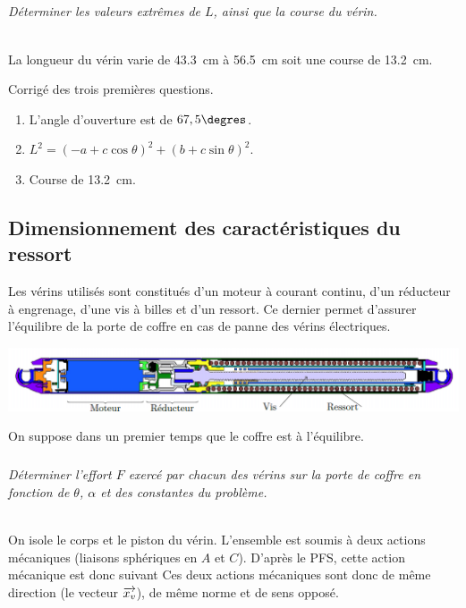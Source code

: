 \documentclass[10pt,fleqn]{article} %
\begin{document}
\begin{multicols}{2}
\subparagraph{}
\textit{Déterminer les valeurs extrêmes de $L$, ainsi que la course du vérin.}
\ifprof
\begin{corrige}~\\
La longueur du vérin varie de \SI{43,3}{cm} à \SI{56,5}{cm} soit une course de \SI{13,2}{cm}. 
\end{corrige}
\else
\fi

\vspace{.25cm}

\footnotesize
\noindent Corrigé des trois premières questions.
\begin{enumerate}
\item L'angle d'ouverture est de $67,5\degres$.
\item $L^2 =\left(-a + c\cos\theta \right)^2 + \left(b + c\sin\theta \right)^2  $.
\item Course de \SI{13,2}{cm}.
\end{enumerate}

\normalsize

\subsection*{Dimensionnement des caractéristiques du ressort}
Les vérins utilisés sont constitués d’un moteur à courant continu, d’un réducteur à engrenage, d’une vis à billes et d’un ressort. Ce dernier permet d'assurer l'équilibre de la porte de coffre en cas de panne des vérins électriques. 

\begin{center}
\includegraphics[width=\linewidth]{images/fig_02}
\end{center}


On suppose dans un premier temps que le coffre est à l’équilibre.

\subparagraph{}
\textit{Déterminer l’effort $F$ exercé par chacun des vérins sur la porte de coffre en fonction de $\theta$, $\alpha$ et des constantes du problème.}
\ifprof
\begin{corrige}~\\
On isole le corps et le piston du vérin. L'ensemble est soumis à deux actions mécaniques (liaisons sphériques en $A$ et $C$). D'après le PFS, cette action mécanique est donc suivant Ces deux actions mécaniques sont donc de même direction (le vecteur $\overrightarrow{x_v}$), de même norme et de sens opposé. 


\end{corrige}
\end{multicols}
\end{document}
